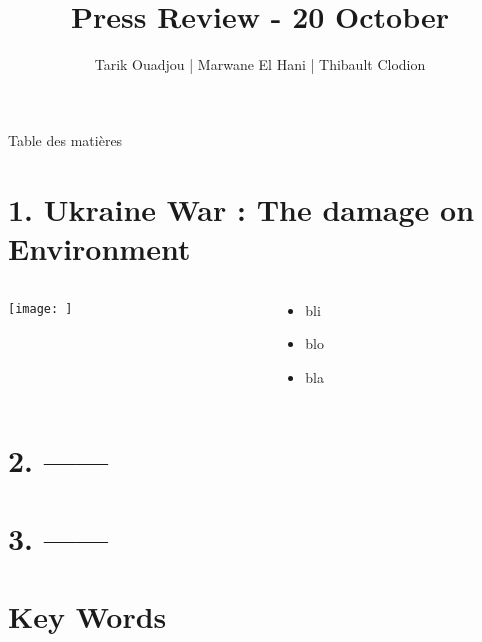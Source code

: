 \documentclass{beamer}
\title{Press Review - 20 October}
\author{Tarik Ouadjou | Marwane El Hani | Thibault Clodion}
\date{ }
\begin{document}
\frame{\titlepage} %

\begin{frame}{Table des matières}
    \tableofcontents
\end{frame}

\section{1. Ukraine War : The damage on Environment}

\begin{columns}

    \begin{column}{5cm}
    \texttt{[image: ]}
    \end{column}
    
    \begin{column}{5cm}
    \begin{itemize}[<+->]
    \item bli
    \item blo
    \item bla
    \end{itemize}
    \end{column}
    \end{columns}

\section{2. ------}

\section{3. ------}

\section{Key Words}


\begin{frame}
\end{frame}
\end{document}
